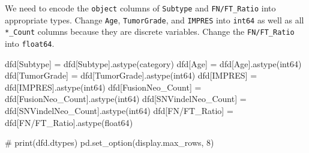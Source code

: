 \documentclass[
  letterpaper,
  DIV=11,
  numbers=noendperiod]{scrartcl}
\newenvironment{Shaded}{\begin{snugshade}}{\end{snugshade}}
\newcommand{\CommentTok}[1]{\textcolor[rgb]{0.37,0.37,0.37}{#1}}
\newcommand{\DecValTok}[1]{\textcolor[rgb]{0.68,0.00,0.00}{#1}}
\newcommand{\NormalTok}[1]{\textcolor[rgb]{0.00,0.23,0.31}{#1}}
\newcommand{\OperatorTok}[1]{\textcolor[rgb]{0.37,0.37,0.37}{#1}}
\newcommand{\StringTok}[1]{\textcolor[rgb]{0.13,0.47,0.30}{#1}}
\begin{document}
We need to encode the \texttt{object} columns of \texttt{Subtype} and
\texttt{FN/FT\_Ratio} into appropriate types. Change \texttt{Age},
\texttt{TumorGrade}, and \texttt{IMPRES} into \texttt{int64} as well as
all \texttt{*\_Count} columns because they are discrete variables.
Change the \texttt{FN/FT\_Ratio} into \texttt{float64}.

\begin{Shaded}
\begin{Highlighting}[]
\NormalTok{dfd[}\StringTok{\textquotesingle{}Subtype\textquotesingle{}}\NormalTok{] }\OperatorTok{=}\NormalTok{ dfd[}\StringTok{\textquotesingle{}Subtype\textquotesingle{}}\NormalTok{].astype(}\StringTok{\textquotesingle{}category\textquotesingle{}}\NormalTok{)}
\NormalTok{dfd[}\StringTok{\textquotesingle{}Age\textquotesingle{}}\NormalTok{] }\OperatorTok{=}\NormalTok{ dfd[}\StringTok{\textquotesingle{}Age\textquotesingle{}}\NormalTok{].astype(}\StringTok{\textquotesingle{}int64\textquotesingle{}}\NormalTok{)}
\NormalTok{dfd[}\StringTok{\textquotesingle{}TumorGrade\textquotesingle{}}\NormalTok{] }\OperatorTok{=}\NormalTok{ dfd[}\StringTok{\textquotesingle{}TumorGrade\textquotesingle{}}\NormalTok{].astype(}\StringTok{\textquotesingle{}int64\textquotesingle{}}\NormalTok{)}
\NormalTok{dfd[}\StringTok{\textquotesingle{}IMPRES\textquotesingle{}}\NormalTok{] }\OperatorTok{=}\NormalTok{ dfd[}\StringTok{\textquotesingle{}IMPRES\textquotesingle{}}\NormalTok{].astype(}\StringTok{\textquotesingle{}int64\textquotesingle{}}\NormalTok{)}
\NormalTok{dfd[}\StringTok{\textquotesingle{}FusionNeo\_Count\textquotesingle{}}\NormalTok{] }\OperatorTok{=}\NormalTok{ dfd[}\StringTok{\textquotesingle{}FusionNeo\_Count\textquotesingle{}}\NormalTok{].astype(}\StringTok{\textquotesingle{}int64\textquotesingle{}}\NormalTok{)}
\NormalTok{dfd[}\StringTok{\textquotesingle{}SNVindelNeo\_Count\textquotesingle{}}\NormalTok{] }\OperatorTok{=}\NormalTok{ dfd[}\StringTok{\textquotesingle{}SNVindelNeo\_Count\textquotesingle{}}\NormalTok{].astype(}\StringTok{\textquotesingle{}int64\textquotesingle{}}\NormalTok{)}
\NormalTok{dfd[}\StringTok{\textquotesingle{}FN/FT\_Ratio\textquotesingle{}}\NormalTok{] }\OperatorTok{=}\NormalTok{ dfd[}\StringTok{\textquotesingle{}FN/FT\_Ratio\textquotesingle{}}\NormalTok{].astype(}\StringTok{\textquotesingle{}float64\textquotesingle{}}\NormalTok{)}

\CommentTok{\# print(dfd.dtypes)}
\NormalTok{pd.set\_option(}\StringTok{\textquotesingle{}display.max\_rows\textquotesingle{}}\NormalTok{, }\DecValTok{8}\NormalTok{)}
\end{Highlighting}
\end{Shaded}
\end{document}
